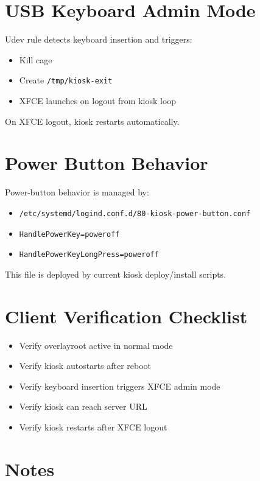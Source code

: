 \documentclass[11pt,letterpaper]{article}
\begin{document}
\section{USB Keyboard Admin Mode}

Udev rule detects keyboard insertion and triggers:

\begin{itemize}
\item Kill cage
\item Create \texttt{/tmp/kiosk-exit}
\item XFCE launches on logout from kiosk loop
\end{itemize}

On XFCE logout, kiosk restarts automatically.

\section{Power Button Behavior}

Power-button behavior is managed by:
\begin{itemize}
\item \texttt{/etc/systemd/logind.conf.d/80-kiosk-power-button.conf}
\item \texttt{HandlePowerKey=poweroff}
\item \texttt{HandlePowerKeyLongPress=poweroff}
\end{itemize}

This file is deployed by current kiosk deploy/install scripts.

\section{Client Verification Checklist}

\begin{itemize}
\item Verify overlayroot active in normal mode
\item Verify kiosk autostarts after reboot
\item Verify keyboard insertion triggers XFCE admin mode
\item Verify kiosk can reach server URL
\item Verify kiosk restarts after XFCE logout
\end{itemize}

\section{Notes}
\end{document}
